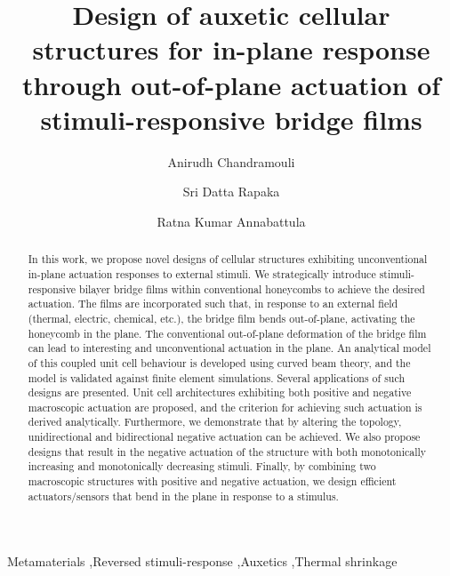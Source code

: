 \documentclass[final,times,5p]{elsarticle}
\numberwithin{equation}{section}
\begin{document}
\begin{frontmatter}
\title{Design of auxetic cellular structures for in-plane response through out-of-plane actuation of stimuli-responsive bridge films}

\author[inst1]{Anirudh Chandramouli}
\author[inst2]{Sri Datta Rapaka}
\author[inst1]{Ratna Kumar Annabattula}
\begin{abstract}
    In this work, we propose novel designs of cellular structures exhibiting unconventional in-plane actuation responses to external stimuli. We strategically introduce stimuli-responsive bilayer bridge films within conventional honeycombs to achieve the desired actuation. The films are incorporated such that, in response to an external field (thermal, electric, chemical, etc.), the bridge film bends out-of-plane, activating the honeycomb in the plane. The conventional out-of-plane deformation of the bridge film can lead to interesting and unconventional actuation in the plane. An analytical model of this coupled unit cell behaviour is developed using curved beam theory, and the model is validated against finite element simulations. Several applications of such designs are presented. Unit cell architectures exhibiting both positive and negative macroscopic actuation are proposed, and the criterion for achieving such actuation is derived analytically. Furthermore, we demonstrate that by altering the topology, unidirectional and bidirectional negative actuation can be achieved. We also propose designs that result in the negative actuation of the structure with both monotonically increasing and monotonically decreasing stimuli. Finally, by combining two macroscopic structures with positive and negative actuation, we design efficient actuators/sensors that bend in the plane in response to a stimulus.
\end{abstract}

\begin{keyword}
Metamaterials \sep Reversed stimuli-response \sep Auxetics \sep  Thermal shrinkage
\end{keyword}
\end{frontmatter}
\end{document}
